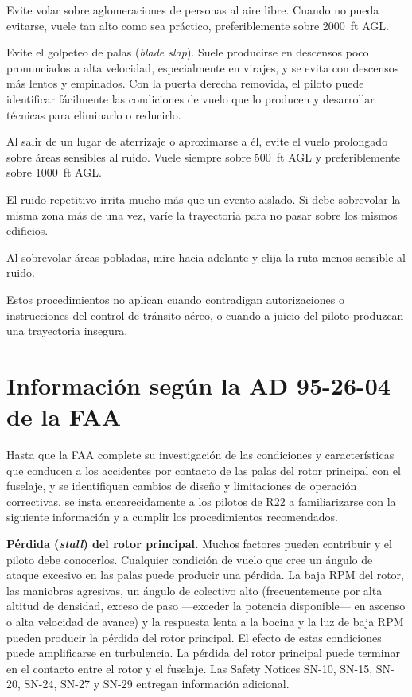 \begin{pasos}
\item Evite volar sobre aglomeraciones de personas al aire libre. Cuando no pueda evitarse, vuele tan alto como sea práctico, preferiblemente sobre 2000~ft AGL.
\item Evite el golpeteo de palas (\emph{blade slap}). Suele producirse en descensos poco pronunciados a alta velocidad, especialmente en virajes, y se evita con descensos más lentos y empinados. Con la puerta derecha removida, el piloto puede identificar fácilmente las condiciones de vuelo que lo producen y desarrollar técnicas para eliminarlo o reducirlo.
\item Al salir de un lugar de aterrizaje o aproximarse a él, evite el vuelo prolongado sobre áreas sensibles al ruido. Vuele siempre sobre 500~ft AGL y preferiblemente sobre 1000~ft AGL.
\item El ruido repetitivo irrita mucho más que un evento aislado. Si debe sobrevolar la misma zona más de una vez, varíe la trayectoria para no pasar sobre los mismos edificios.
\item Al sobrevolar áreas pobladas, mire hacia adelante y elija la ruta menos sensible al ruido.
\end{pasos}

\begin{nota}
Estos procedimientos no aplican cuando contradigan autorizaciones o instrucciones del control de tránsito aéreo, o cuando a juicio del piloto produzcan una trayectoria insegura.
\end{nota}

\section{Información según la AD 95-26-04 de la FAA}

Hasta que la FAA complete su investigación de las condiciones y características que conducen a los accidentes por contacto de las palas del rotor principal con el fuselaje, y se identifiquen cambios de diseño y limitaciones de operación correctivas, se insta encarecidamente a los pilotos de R22 a familiarizarse con la siguiente información y a cumplir los procedimientos recomendados.

\textbf{Pérdida (\emph{stall}) del rotor principal.} Muchos factores pueden contribuir y el piloto debe conocerlos. Cualquier condición de vuelo que cree un ángulo de ataque excesivo en las palas puede producir una pérdida. La baja RPM del rotor, las maniobras agresivas, un ángulo de colectivo alto (frecuentemente por alta altitud de densidad, exceso de paso ---exceder la potencia disponible--- en ascenso o alta velocidad de avance) y la respuesta lenta a la bocina y la luz de baja RPM pueden producir la pérdida del rotor principal. El efecto de estas condiciones puede amplificarse en turbulencia. La pérdida del rotor principal puede terminar en el contacto entre el rotor y el fuselaje. Las Safety Notices SN-10, SN-15, SN-20, SN-24, SN-27 y SN-29 entregan información adicional.

